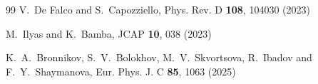 \documentclass[11pt,a4paper]{article}
\begin{document}
\begin{thebibliography}{99}
V.~De Falco and S.~Capozziello,
Phys. Rev. D \textbf{108}, 104030 (2023)

M.~Ilyas and K.~Bamba,
JCAP \textbf{10}, 038 (2023)

K.~A.~Bronnikov, S.~V.~Bolokhov, M.~V.~Skvortsova, R.~Ibadov and F.~Y.~Shaymanova,
Eur. Phys. J. C \textbf{85}, 1063 (2025)


\end{thebibliography}
\end{document}
